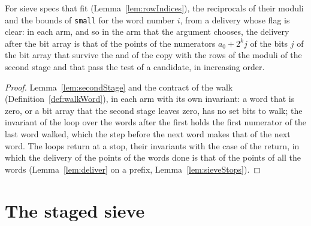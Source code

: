 \begin{lemma}\label{lem:siftBitArray}
  \leanok
  For sieve specs that fit (Lemma~\ref{lem:rowIndices}), the reciprocals of their moduli and the
  bounds of \verb|small| for the word number $i$, from a delivery whose flag is clear: in each arm,
  and so in the arm that the argument chooses, the delivery after the bit array is that of the
  points of the numerators $a_0 + 2^k j$ of the bits $j$ of the bit array that survive the and of
  the copy with the rows of the moduli of the second stage and that pass the test of a candidate, in
  increasing order.
\end{lemma}

\begin{proof}
  \leanok
  Lemma~\ref{lem:secondStage} and the contract of the walk (Definition~\ref{def:walkWord}), in each
  arm with its own invariant: a word that is zero, or a bit array that the second stage leaves zero,
  has no set bits to walk; the invariant of the loop over the words after the first holds the first
  numerator of the last word walked, which the step before the next word makes that of the next
  word. The loops return at a stop, their invariants with the case of the return, in which the
  delivery of the points of the words done is that of the points of all the words
  (Lemma~\ref{lem:deliver} on a prefix, Lemma~\ref{lem:sieveStops}).
\end{proof}

\section{The staged sieve}\label{sec:staged}

